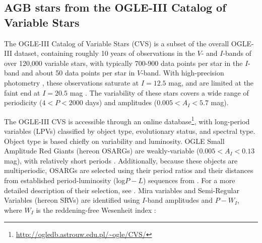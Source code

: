 
\subsection{AGB stars from the OGLE-III Catalog of Variable Stars}\label{sec:ogle}
The OGLE-III Catalog of Variable Stars (CVS) \citep{2008AcA....58...69U,2009AcA....59..239S,2011AcA....61..217S} is a subset of the overall OGLE-III dataset, containing roughly 10 years of observations in the $V$- and $I$-bands of over 120,000 variable stars, with typically 700-900 data points per star in the $I$-band and about 50 data points per star in $V$-band. With high-precision photometry \citep[$\sim0.01$ mag,][]{2007AcA....57..201S}, these observations saturate at $I = 12.5$ mag, and are limited at the faint end at $I = 20.5$ mag \citep{2001AcA....51..303Z}. The variability of these stars covers a wide range of periodicity ($4 < P < 2000$ days) and amplitudes ($0.005 < A_I < 5.7$ mag).

The OGLE-III CVS is accessible through an online database\footnote{\url{http://ogledb.astrouw.edu.pl/~ogle/CVS/}}, with long-period variables (LPVs) classified by object type, evolutionary status, and spectral type. Object type is based chiefly on variability and luminosity. OGLE Small Amplitude Red Giants (hereon OSARGs) are weakly-variable ($0.005 < A_I < 0.13$ mag), with relatively short periods \citep[$10 < P < 100$ days;][]{2004AcA....54..129S}. Additionally, because these objects are multiperiodic, OSARGs are selected using their period ratios and their distances from established period-luminosity (log$P-L$) sequences from \cite{1999IAUS..191..151W}. For a more detailed description of their selection, see \cite{2007AcA....57..201S}. Mira variables and Semi-Regular Variables (hereon SRVs) are identified using $I$-band amplitudes and $P-W_I$, where $W_I$ is the reddening-free Wesenheit index \citep{2005AcA....55..331S}:

